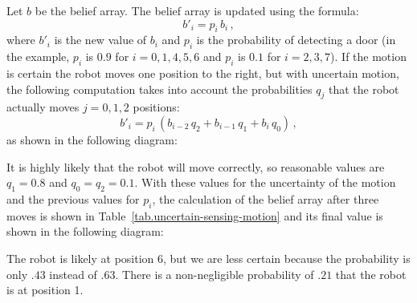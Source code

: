 Let $b$ be the belief array. The belief array is updated using the formula:\begin{displaymath}
b'_i = p_i \, b_i\,,
\end{displaymath}
where $b'_i$ is the new value of $b_i$ and $p_i$ is the probability of detecting a door (in the example, $p_i$ is $0.9$ for $i=0,1,4,5,6$ and $p_i$ is $0.1$ for $i=2,3,7$). If the motion is certain the robot moves one position to the right, but with uncertain motion, the following computation takes into account the probabilities $q_j$ that the robot actually moves $j=0,1,2$ positions:
\begin{displaymath}
b'_i = p_i \,(b_{i-2}\, q_2 + b_{i-1}\, q_1 + b_{i}\, q_0)\,,
\end{displaymath}
as shown in the following diagram:
\begin{center}
\end{center}
It is highly likely that the robot will move correctly, so reasonable values are $q_1=0.8$ and $q_0=q_2=0.1$. With these values for the uncertainty of the motion and the previous values for $p_i$, the calculation of the belief array after three moves is shown in Table~\ref{tab.uncertain-sensing-motion} and its final value is shown in the following diagram:
\begin{center}
\end{center}
The robot is likely at position 6, but we are less certain because the probability is only $.43$ instead of $.63$. There is a non-negligible probability of $.21$ that the robot is at position 1.

